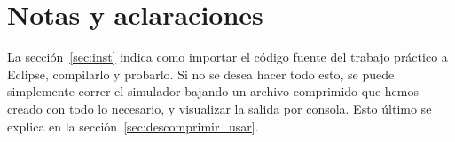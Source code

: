\section{Notas y aclaraciones}

La sección~\ref{sec:inst} indica como importar el código fuente del trabajo
práctico a Eclipse, compilarlo y probarlo. Si no se desea hacer todo esto, se
puede simplemente correr el simulador bajando un archivo comprimido que hemos
creado con todo lo necesario, y visualizar la salida por consola. Esto último
se explica en la sección~\ref{sec:descomprimir_usar}.





